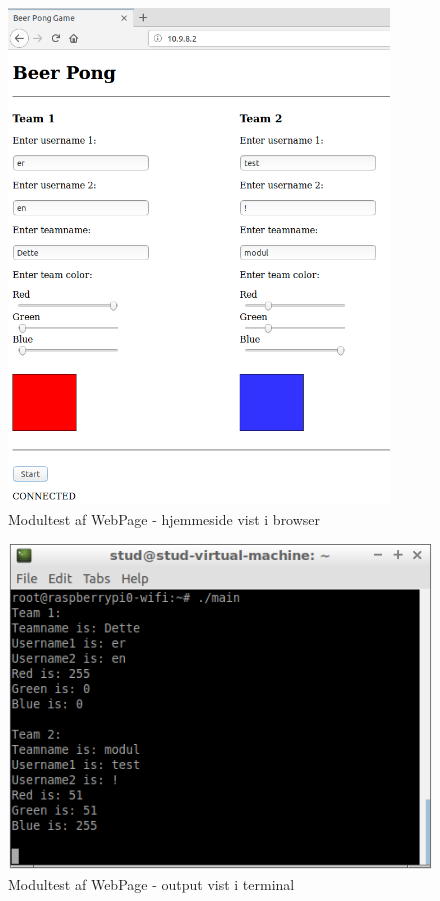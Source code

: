 \documentclass[Modultest/Modultest_main.tex]{subfiles}
\begin{document}
\begin{figure}[H]
    \centering
    \includegraphics[width=0.9\textwidth]{Modultest/WebPage/graphics/modultest_1.png}
    \caption{Modultest af WebPage - hjemmeside vist i browser}
    \label{fig:WebPage_1}
\end{figure}
\begin{figure}[H]
    \centering
    \includegraphics[width=\textwidth]{Modultest/WebPage/graphics/modultest_2.png}
    \caption{Modultest af WebPage - output vist i terminal}
    \label{fig:WebPage_2}
\end{figure}
\end{document}
